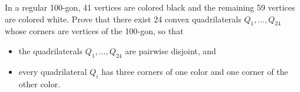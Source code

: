 In a regular 100-gon, 41 vertices are colored black and the remaining 59 vertices are colored white. Prove that there exist 24 convex quadrilaterals $Q_{1}, \ldots, Q_{24}$ whose corners are vertices of the 100-gon, so that
\begin{itemize}
	\item the quadrilaterals $Q_{1}, \ldots, Q_{24}$ are pairwise disjoint, and
	\item every quadrilateral $Q_{i}$ has three corners of one color and one corner of the other color.
\end{itemize}
